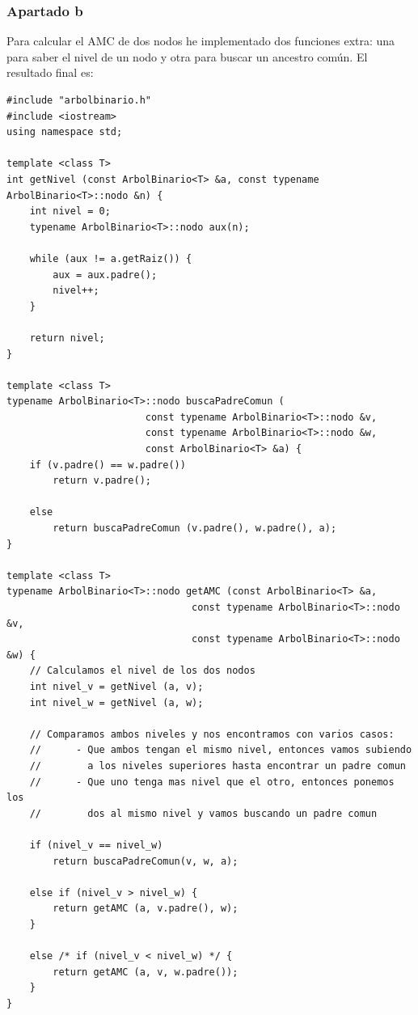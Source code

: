 \documentclass[10pt,a4paper,spanish]{report}
\begin{document}
\subsubsection{\textcolor[rgb]{0.5,0.8,1}Apartado b}
\noindent
Para calcular el AMC de dos nodos he implementado dos funciones extra: una para saber el nivel de un nodo y otra para buscar un ancestro común. El resultado final es:

\begin{verbatim}
#include "arbolbinario.h"
#include <iostream>
using namespace std;

template <class T>
int getNivel (const ArbolBinario<T> &a, const typename ArbolBinario<T>::nodo &n) {
    int nivel = 0;
    typename ArbolBinario<T>::nodo aux(n);

    while (aux != a.getRaiz()) {
        aux = aux.padre();
        nivel++;
    }

    return nivel;
}

template <class T>
typename ArbolBinario<T>::nodo buscaPadreComun (
                        const typename ArbolBinario<T>::nodo &v, 
                        const typename ArbolBinario<T>::nodo &w,
                        const ArbolBinario<T> &a) {
    if (v.padre() == w.padre())
        return v.padre();

    else
        return buscaPadreComun (v.padre(), w.padre(), a);    
}

template <class T>
typename ArbolBinario<T>::nodo getAMC (const ArbolBinario<T> &a, 
                                const typename ArbolBinario<T>::nodo &v, 
                                const typename ArbolBinario<T>::nodo &w) {
    // Calculamos el nivel de los dos nodos
    int nivel_v = getNivel (a, v);
    int nivel_w = getNivel (a, w);

    // Comparamos ambos niveles y nos encontramos con varios casos:
    //      - Que ambos tengan el mismo nivel, entonces vamos subiendo
    //        a los niveles superiores hasta encontrar un padre comun
    //      - Que uno tenga mas nivel que el otro, entonces ponemos los 
    //        dos al mismo nivel y vamos buscando un padre comun

    if (nivel_v == nivel_w)
        return buscaPadreComun(v, w, a);

    else if (nivel_v > nivel_w) {
        return getAMC (a, v.padre(), w); 
    }

    else /* if (nivel_v < nivel_w) */ {
        return getAMC (a, v, w.padre());
    }
}
\end{verbatim}
\end{document}
